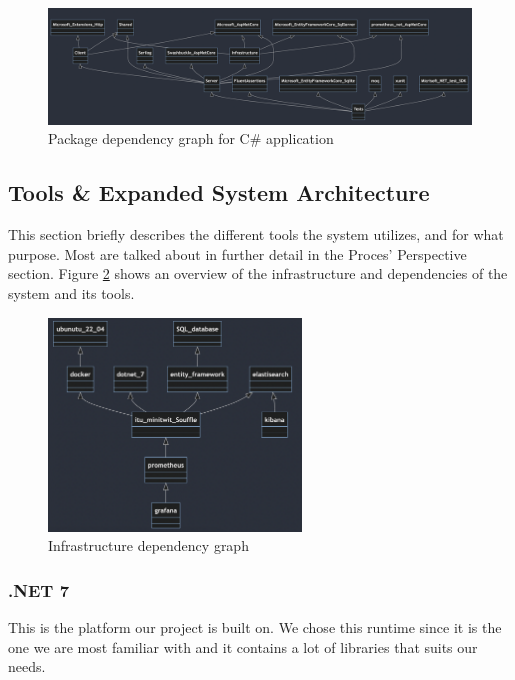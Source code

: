 \begin{figure}[H]
    \centering
    \includegraphics[width = \textwidth]{Report/Images/dependencies2.png}
    \caption{Package dependency graph for C\# application}
    \label{fig:packageDependencyGraph}
    \centering
\end{figure}

\subsection{Tools \& Expanded System Architecture}

This section briefly describes the different tools the system utilizes, and for what purpose. Most are talked about in further detail in the Proces' Perspective section. Figure  \ref{fig:infrastructureDependencyGrapg} shows an overview of the infrastructure and dependencies of the system and its tools. 

\begin{figure}[H]
    \centering
    \includegraphics[width = 0.6\textwidth]{Report/Images/application_dependencies.png}
    \caption{Infrastructure dependency graph}
    \label{fig:infrastructureDependencyGrapg}
    \centering
\end{figure}


\subsubsection{.NET 7}
This is the platform our project is built on. We chose this runtime since it is the one we are most familiar with and it contains a lot of libraries that suits our needs. 

